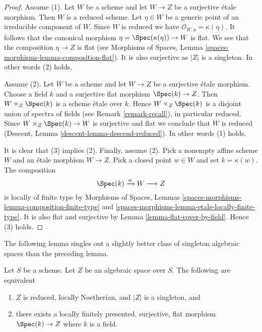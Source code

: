 \begin{proof}
Assume (1). Let $W$ be a scheme and
let $W \to Z$ be a surjective \'etale morphism. Then $W$ is
a reduced scheme. Let $\eta \in W$ be a generic point of an irreducible
component of $W$. Since $W$ is reduced we have
$\mathcal{O}_{W, \eta} = \kappa(\eta)$. It follows that the canonical
morphism $\eta = \Spec(\kappa(\eta)) \to W$ is flat. We see that the
composition $\eta \to Z$ is flat (see
Morphisms of Spaces, Lemma \ref{spaces-morphisms-lemma-composition-flat}).
It is also surjective as $|Z|$ is a singleton. In other words
(2) holds.

\medskip\noindent
Assume (2). Let $W$ be a scheme and
let $W \to Z$ be a surjective \'etale morphism. Choose a field
$k$ and a surjective flat morphism $\Spec(k) \to Z$.
Then $W \times_Z \Spec(k)$ is a scheme \'etale over $k$.
Hence $W \times_Z \Spec(k)$ is a disjoint union of spectra of fields
(see Remark \ref{remark-recall}), in particular reduced. Since
$W \times_Z \Spec(k) \to W$
is surjective and flat we conclude that $W$ is reduced
(Descent, Lemma \ref{descent-lemma-descend-reduced}).
In other words (1) holds.

\medskip\noindent
It is clear that (3) implies (2). Finally, assume (2). Pick a nonempty
affine scheme $W$ and an \'etale morphism $W \to Z$. Pick a closed
point $w \in W$ and set $k = \kappa(w)$. The composition
$$
\Spec(k) \xrightarrow{w} W \longrightarrow Z
$$
is locally of finite type by
Morphisms of Spaces, Lemmas
\ref{spaces-morphisms-lemma-composition-finite-type} and
\ref{spaces-morphisms-lemma-etale-locally-finite-type}.
It is also flat and surjective by
Lemma \ref{lemma-flat-cover-by-field}.
Hence (3) holds.
\end{proof}

\noindent
The following lemma singles out a slightly better class of singleton
algebraic spaces than the preceding lemma.

\begin{lemma}
\label{lemma-unique-point-better}
Let $S$ be a scheme. Let $Z$ be an algebraic space over $S$.
The following are equivalent
\begin{enumerate}
\item $Z$ is reduced, locally Noetherian, and $|Z|$
is a singleton, and
\item there exists a locally finitely presented, surjective, flat morphism
$\Spec(k) \to Z$ where $k$ is a field.
\end{enumerate}
\end{lemma}

